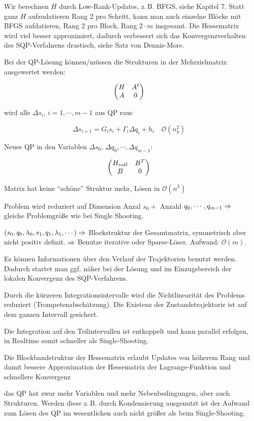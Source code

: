 Wir berechnen $H$ durch Low-Rank-Updates, z.\,B. BFGS, siehe Kapitel 7. Statt ganz $H$ aufzudatieren Rang 2 pro Schritt, kann man auch einzelne Blöcke mit BFGS aufdatieren, Rang 2 pro Block, Rang $2\cdot m$ insgesamt. Die Hessematrix wird viel besser approximiert, dadurch verbessert sich das Konvergenzverhalten des SQP-Verfahrens drastisch, siehe Satz von Dennis-More.

Bei der QP-Lösung können/müssen die Strukturen in der Mehrzielmatrix ausgewertet werden:

\[ \begin{pmatrix} H & A^t \\ A & 0 \end{pmatrix} \]


wird alle $\Delta s_i$, $i=1,\cdots,m-1$ aus QP raus

\[ \Delta s_{i+1} = G_i s_i + \Gamma_i \Delta q_i + h_i \quad \mathcal O(n_y^2) \]

Neues QP in den Variablen $\Delta s_0$, $\Delta q_0, \cdots, \Delta q_{m-1}$:

\[ \begin{pmatrix} H_{voll} & B^T \\ B & 0 \end{pmatrix} \]

Matrix hat keine "`schöne"' Struktur mehr, Lösen in $\mathcal O(n^3)$

Problem wird reduziert auf Dimension Anzal $s_0 + $ Anzahl $q_0,\cdots,q_{m-1} \Rightarrow$ gleiche Problemgröße wie bei Single Shooting.


$(s_0, q_0, \lambda_0, s_1, q_1, \lambda_1, \cdots ) \Rightarrow$ Blockstruktur der Gesamtmatrix, symmetrisch aber nicht positiv definit. $\Rightarrow$ Benutze iterative oder Sparse-Löser. Aufwand: $\mathcal O(m)$.


\bitm
\item Es können Informationen über den Verlauf der Trajektorien benutzt werden. Dadurch startet man ggf. näher bei der Lösung und im Einzugsbereich der lokalen Konvergenz des SQP-Verfahrens.
\item Durch die kürzeren Integrationsintervalle wird die Nichtlinearität des Problems reduziert (Trompetenabschätzung). Die Existenz der Zustandstrajektorie ist auf dem ganzen Intervall gesichert.
\item Die Integration auf den Teilintervallen ist entkoppelt und kann parallel erfolgen, in Realtime somit schneller als Single-Shooting.
\item Die Blockbandstruktur der Hessematrix erlaubt Updates von höherem Rang und damit bessere Approximation der Hessematrix der Lagrange-Funktion und schnellere Konvergenz
\item das QP hat zwar mehr Variablen und mehr Nebenbedingungen, aber auch Strukturen. Werden diese z.\,B. durch Kondensierung ausgenutzt ist der Aufwand zum Lösen des QP im wesentlichen auch nicht größer als beim Single-Shooting.
\eitm

